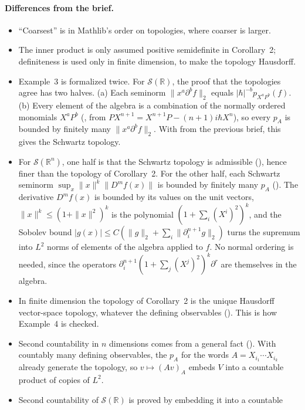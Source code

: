 \documentclass[11pt]{article}
\begin{document}
\paragraph{Differences from the brief.}
\begin{itemize}
\item ``Coarsest'' is  in Mathlib's order on topologies, where coarser is
  larger.
\item The inner product is only assumed positive semidefinite in Corollary~2; definiteness is
  used only in finite dimension, to make the topology Hausdorff.
\item Example~3 is formalized twice. For $\mathcal{S}(\mathbb{R})$, the proof that the
  topologies agree has two halves. (a) Each seminorm $\|x^a \partial^b f\|_2$
  equals $|\hbar|^{-b} p_{X^a P^b}(f)$. (b) Every element of the algebra is a combination of the
  normally ordered monomials $X^a P^b$ (, from
  $P X^{n+1} = X^{n+1} P - (n+1) i\hbar X^n$), so every $p_A$ is bounded by finitely many
  $\|x^a \partial^b f\|_2$. With  from the previous brief, this gives
  the Schwartz topology.
\item For $\mathcal{S}(\mathbb{R}^n)$, one half is that the Schwartz topology is admissible
  (), hence finer than the topology of Corollary~2. For the other
  half, each Schwartz seminorm $\sup_x \|x\|^k \|D^m f(x)\|$ is bounded by finitely many $p_A$
  (). The derivative $D^m f(x)$ is bounded by its values on the unit
  vectors, $\|x\|^k \le (1 + \|x\|^2)^k$ is the polynomial $(1 + \sum_i (X^i)^2)^k$, and the
  Sobolev bound $|g(x)| \le C (\|g\|_2 + \sum_i \|\partial_i^{n+1} g\|_2)$ turns the supremum
  into $L^2$ norms of elements of the algebra applied to $f$. No normal ordering is needed, since
  the operators $\partial_i^{n+1} (1 + \sum_j (X^j)^2)^k \partial^r$ are themselves in the
  algebra.
\item In finite dimension the topology of Corollary~2 is the unique Hausdorff vector-space
  topology, whatever the defining observables (). This is how
  Example~4 is checked.
\item Second countability in $n$ dimensions comes from a general fact
  (). With countably many defining observables, the $p_A$
  for the words $A = X_{i_1} \cdots X_{i_k}$ already generate the topology, so $v \mapsto (Av)_A$
  embeds $V$ into a countable product of copies of $L^2$.
\item Second countability of $\mathcal{S}(\mathbb{R})$ is proved by embedding it into a countable

\end{itemize}
\end{document}
